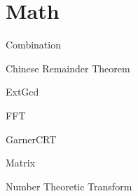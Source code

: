 \section{Math}

Combination


Chinese Remainder Theorem


ExtGcd


FFT


GarnerCRT


Matrix


Number Theoretic Transform

